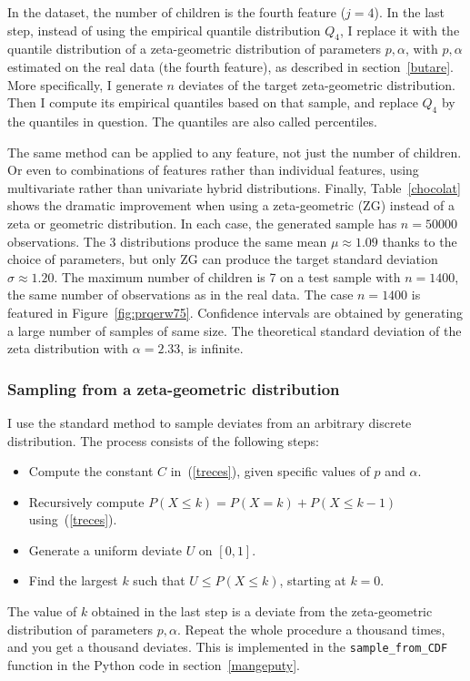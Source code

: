 \documentclass[oneside,10pt]{book}
\begin{document}
In the dataset, the number of children is the fourth feature ($j=4$). In the last step, instead of using the empirical quantile distribution $Q_4$,
 I replace it with the quantile distribution of a zeta-geometric distribution of parameters $p,\alpha$, with $p,\alpha$ estimated on the real data (the fourth feature), as described in section~\ref{butare}. More specifically, I generate $n$ deviates of the
 target zeta-geometric distribution. Then I compute its empirical quantiles based on that sample, and replace $Q_4$ by the quantiles in question. The quantiles are also called percentiles.

The same method can be applied to any feature, not just the number of children. Or even to combinations of features rather than individual features, using multivariate rather than univariate hybrid distributions. Finally, Table~\ref{chocolat} shows the dramatic improvement when using
 a zeta-geometric (ZG) instead of a zeta or geometric distribution. In each case, the generated sample has $n =\num{50000}$ observations.
 The 3 distributions produce the same mean $\mu\approx 1.09$ thanks to the choice of parameters, but only ZG can produce
the target standard deviation $\sigma\approx 1.20$. The maximum number of children is 7 on a test sample with $n=1400$, the same number
 of observations as in the real data. The case $n=1400$ is featured in Figure~\ref{fig:prqerw75}. Confidence intervals are obtained by generating a large number of samples of same size. The theoretical standard deviation of the zeta distribution with $\alpha = 2.33$, is infinite.


\subsubsection{Sampling from a zeta-geometric distribution}

I use the standard method to sample deviates from an arbitrary discrete distribution. The process consists of the following steps: \vspace{1ex}
\begin{itemize}
\item Compute the constant $C$ in~(\ref{treces}), given specific values of $p$ and $\alpha$.
\item Recursively compute $P(X\leq k)= P(X=k)+P(X\leq k-1)$ using~(\ref{treces}).
\item Generate a uniform deviate $U$ on $[0, 1]$.
\item Find the largest $k$ such that $U\leq P(X\leq k)$, starting at $k=0$.
\end{itemize}\vspace{1ex}
The value of $k$ obtained in the last step is a deviate from the zeta-geometric distribution of parameters $p,\alpha$. Repeat the whole
 procedure a thousand times, and you get a thousand deviates. This is implemented
 in the \texttt{sample\_from\_CDF} function in the Python code in section~\ref{mangeputy}.
\end{document}
